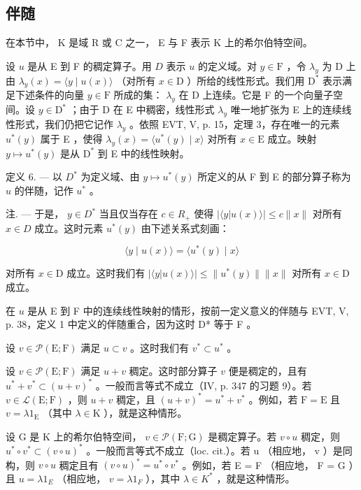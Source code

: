 \subsection{伴随}

在本节中， K 是域 R 或 C 之一， E 与 F 表示 K 上的希尔伯特空间。

设 \(u\) 是从 E 到 F 的稠定算子。用 \(D\) 表示 \(u\) 的定义域。对 \(y \in \mathrm{F}\) ，令 \(\lambda_y\) 为 D 上由 \(\lambda_y(x) = \langle y \mid u(x) \rangle\) （对所有 \(x \in \mathrm{D}\) ）所给的线性形式。我们用 \(\mathrm{D}^*\) 表示满足下述条件的向量 \(y \in \mathrm{F}\) 所成的集： \(\lambda_y\) 在 D 上连续。它是 F 的一个向量子空间。设 \(y \in \mathrm{D}^*\) ；由于 D 在 E 中稠密，线性形式 \(\lambda_y\) 唯一地扩张为 E 上的连续线性形式，我们仍把它记作 \(\lambda_y\) 。依照 EVT, V, p. 15，定理 3，存在唯一的元素 \(u^*(y)\) 属于 E ，使得 \(\lambda_y(x) = \langle u^*(y) \mid x \rangle\) 对所有 \(x \in \mathrm{E}\) 成立。映射 \(y \mapsto u^*(y)\) 是从 \(\mathrm{D}^*\) 到 E 中的线性映射。

定义 6. --- 以 \(D^*\) 为定义域、由 \(y \mapsto u^*(y)\) 所定义的从 F 到 E 的部分算子称为 \(u\) 的伴随，记作 \(u^*\) 。

注. --- 于是， \(y \in D^{*}\) 当且仅当存在 \(c \in R_{+}\) 使得 \(|\langle y | u(x) \rangle| \leqslant c \|x\|\) 对所有 \(x \in D\) 成立。这时元素 \(u^{*}(y)\) 由下述关系式刻画：

\[
\langle y \mid u (x) \rangle = \langle u ^ {*} (y) \mid x \rangle\tag{1}
\]

对所有 \(x \in \mathrm{D}\) 成立。这时我们有 \(|\langle y | u(x) \rangle| \leqslant \| u^{*}(y) \| \| x \|\) 对所有 \(x \in \mathrm{D}\) 成立。

在 \(u\) 是从 E 到 F 中的连续线性映射的情形，按前一定义意义的伴随与 EVT, V, p. 38，定义 1 中定义的伴随重合，因为这时 D* 等于 F 。

设 \(v \in \mathcal{P}(\mathrm{E};\mathrm{F})\) 满足 \(u \subset v\) 。这时我们有 \(v^{*} \subset u^{*}\) 。

设 \(v \in \mathcal{P}(\mathrm{E};\mathrm{F})\) 满足 \(u + v\) 稠定。这时部分算子 \(v\) 便是稠定的，且有 \(u^{*} + v^{*} \subset (u + v)^{*}\) 。一般而言等式不成立（IV, p. 347 的习题 9）。若 \(v \in \mathcal{L}(\mathrm{E};\mathrm{F})\) ，则 \(u + v\) 稠定，且 \((u + v)^{*} = u^{*} + v^{*}\) 。例如，若 \(\mathrm{F} = \mathrm{E}\) 且 \(v = \lambda 1_{\mathrm{E}}\) （其中 \(\lambda \in \mathrm{K}\) ），就是这种情形。

设 G 是 K 上的希尔伯特空间， \(v \in \mathcal{P}(\mathrm{F};\mathrm{G})\) 是稠定算子。若 \(v \circ u\) 稠定，则 \(u^{*} \circ v^{*} \subset (v \circ u)^{*}\) 。一般而言等式不成立（loc. cit.）。若 u （相应地， v ）是同构，则 \(v \circ u\) 稠定且有 \((v \circ u)^{*} = u^{*} \circ v^{*}\) 。例如，若 E = F （相应地， F = G ）且 \(u = \lambda 1_{E}\) （相应地， \(v = \lambda 1_{F}\) ），其中 \(\lambda \in K^{*}\) ，就是这种情形。

